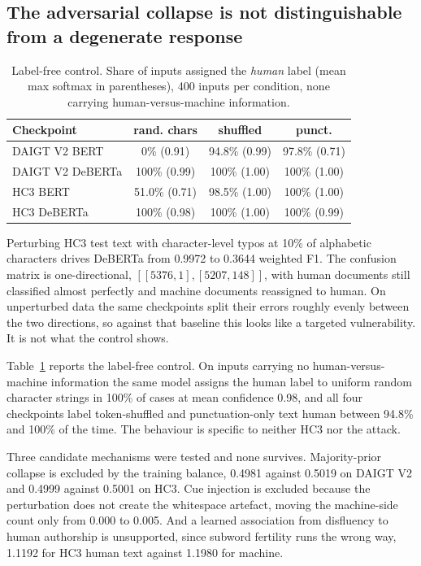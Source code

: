 \subsection{The adversarial collapse is not distinguishable from a degenerate response}
\label{sec:labelfree}

\begin{table}[!ht]
\centering
\caption{Label-free control. Share of inputs assigned the \emph{human} label (mean max softmax in parentheses), 400 inputs per condition, none carrying human-versus-machine information.}
\label{tab:labelfree}
\footnotesize
\setlength{\tabcolsep}{3.5pt}
\begin{tabular}{@{}lccc@{}}
\toprule
Checkpoint & rand. chars & shuffled & punct. \\
\midrule
DAIGT V2 BERT & 0\% (0.91) & 94.8\% (0.99) & 97.8\% (0.71) \\
DAIGT V2 DeBERTa & 100\% (0.99) & 100\% (1.00) & 100\% (1.00) \\
HC3 BERT & 51.0\% (0.71) & 98.5\% (1.00) & 100\% (1.00) \\
HC3 DeBERTa & 100\% (0.98) & 100\% (1.00) & 100\% (0.99) \\
\bottomrule
\end{tabular}
\end{table}

Perturbing HC3 test text with character-level typos at 10\% of alphabetic characters drives DeBERTa from 0.9972 to 0.3644 weighted F1. The confusion matrix is one-directional, $[[5376, 1], [5207, 148]]$, with human documents still classified almost perfectly and machine documents reassigned to human. On unperturbed data the same checkpoints split their errors roughly evenly between the two directions, so against that baseline this looks like a targeted vulnerability. It is not what the control shows.

Table~\ref{tab:labelfree} reports the label-free control. On inputs carrying no human-versus-machine information the same model assigns the human label to uniform random character strings in 100\% of cases at mean confidence 0.98, and all four checkpoints label token-shuffled and punctuation-only text human between 94.8\% and 100\% of the time. The behaviour is specific to neither HC3 nor the attack.

Three candidate mechanisms were tested and none survives. Majority-prior collapse is excluded by the training balance, 0.4981 against 0.5019 on DAIGT V2 and 0.4999 against 0.5001 on HC3. Cue injection is excluded because the perturbation does not create the whitespace artefact, moving the machine-side count only from 0.000 to 0.005. And a learned association from disfluency to human authorship is unsupported, since subword fertility runs the wrong way, 1.1192 for HC3 human text against 1.1980 for machine.

